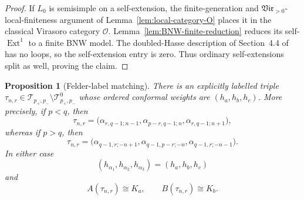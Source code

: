 \documentclass[12pt,leqno]{amsart}
\numberwithin{equation}{section}
\newtheorem{prop}[thm]{Proposition}
\newcommand{\Ext}{\operatorname{Ext}}
\newcommand{\Vir}{\mathfrak{Vir}}
\begin{document}
\begin{proof}
If $L_0$ is semisimple on a self-extension, the finite-generation and
$\Vir_{>0}$-local-finiteness argument of
Lemma~\ref{lem:local-category-O} places it in the classical Virasoro
category $\mathcal O$.  Lemma~\ref{lem:BNW-finite-reduction} reduces its
self-$\Ext^1$ to a finite BNW model.  The doubled-Hasse description of
Section~4.4 of \cite{BoeNakanoWiesner} has no loops, so the self-extension
entry is zero.  Thus ordinary self-extensions split as well, proving the
claim.
\end{proof}

\begin{prop}[Felder-label matching]\label{prop:Felder-labels}
There is an explicitly labelled triple
$\tau_{n,r}\in
\mathcal T_{p_+,p_-}\setminus\mathcal T^0_{p_+,p_-}$
whose ordered conformal weights are $(h_a,h_b,h_c)$.  More precisely, if
$p<q$, then
\begin{equation}\label{eq:tau-p-less-q}
 \tau_{n,r}=
 \bigl(\alpha_{r,q-1;n-1},
       \alpha_{p-r,q-1;n},
       \alpha_{r,q-1;n+1}\bigr),
\end{equation}
whereas if $p>q$, then
\begin{equation}\label{eq:tau-p-greater-q}
 \tau_{n,r}=
 \bigl(\alpha_{q-1,r;-n+1},
       \alpha_{q-1,p-r;-n},
       \alpha_{q-1,r;-n-1}\bigr).
\end{equation}
In either case
\begin{equation}\label{eq:tau-nr}
 (h_{\alpha_1},h_{\alpha_2},h_{\alpha_3})=(h_a,h_b,h_c)
\end{equation}
and
\begin{equation}\label{eq:A-B-tau}
 A(\tau_{n,r})\cong K_a,
 \qquad
 B(\tau_{n,r})\cong K_b.
\end{equation}
\end{prop}
\end{document}
